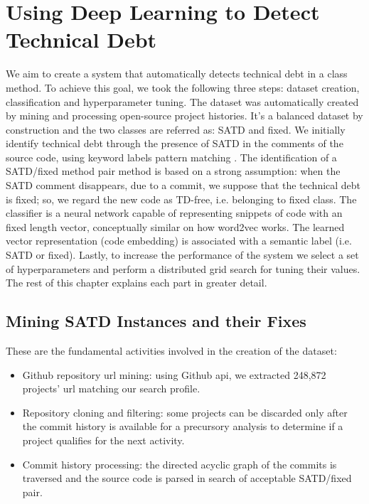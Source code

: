 

\chapter{Using Deep Learning to Detect Technical Debt}

We aim to create a system that automatically detects technical debt in a class method. To achieve this goal, we took the following three steps: dataset creation, classification and hyperparameter tuning.
The dataset was automatically created by mining and processing open-source project histories. It's a balanced dataset by construction and the two classes are referred as: SATD and fixed.
We initially identify technical debt through the presence of SATD in the comments of the source code, using keyword labels pattern matching \cite{potdar2014exploratory} \cite{rantala2020prevalence}.
The identification of a SATD/fixed method pair method is based on a strong assumption: when the SATD comment disappears, due to a commit, we suppose that the technical debt is fixed; so, we regard the new code as TD-free, i.e. belonging to fixed class.
The classifier is a neural network capable of representing snippets of code with an fixed length vector, conceptually similar on how word2vec works. The learned vector representation (code embedding) is associated with a semantic label (i.e. SATD or fixed).
Lastly, to increase the performance of the system we select a set of hyperparameters and perform a distributed grid search for tuning their values. The rest of this chapter explains each part in greater detail.

\section{Mining SATD Instances and their Fixes}

These are the fundamental activities involved in the creation of the dataset:
\begin{itemize}
    \item Github repository url mining: using Github api, we extracted 248,872 projects' url matching our search profile.
    \item Repository cloning and filtering: some projects can be discarded only after the commit history is available for a precursory analysis to determine if a project qualifies for the next activity.
    \item Commit history processing: the directed acyclic graph of the commits is traversed and the source code is parsed in search of acceptable SATD/fixed pair.
\end{itemize}

